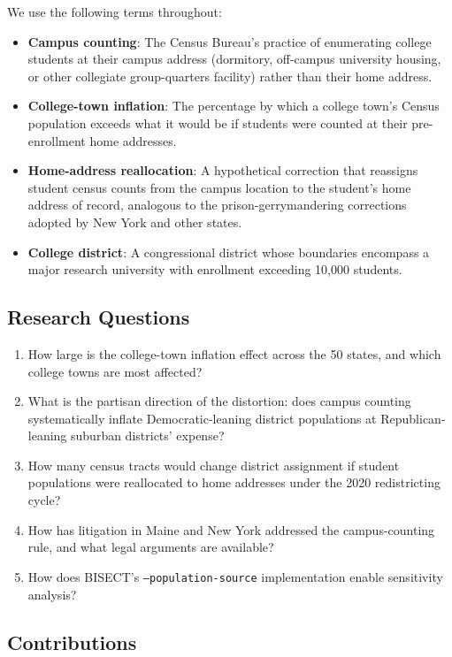 We use the following terms throughout:
\begin{itemize}
    \item \textbf{Campus counting}: The Census Bureau's practice of enumerating college students at their campus address (dormitory, off-campus university housing, or other collegiate group-quarters facility) rather than their home address.
    \item \textbf{College-town inflation}: The percentage by which a college town's Census population exceeds what it would be if students were counted at their pre-enrollment home addresses.
    \item \textbf{Home-address reallocation}: A hypothetical correction that reassigns student census counts from the campus location to the student's home address of record, analogous to the prison-gerrymandering corrections adopted by New York and other states.
    \item \textbf{College district}: A congressional district whose boundaries encompass a major research university with enrollment exceeding 10,000 students.
\end{itemize}

\subsection{Research Questions}

\begin{enumerate}
    \item How large is the college-town inflation effect across the 50 states, and which college towns are most affected?
    \item What is the partisan direction of the distortion: does campus counting systematically inflate Democratic-leaning district populations at Republican-leaning suburban districts' expense?
    \item How many census tracts would change district assignment if student populations were reallocated to home addresses under the 2020 redistricting cycle?
    \item How has litigation in Maine and New York addressed the campus-counting rule, and what legal arguments are available?
    \item How does BISECT's \texttt{--population-source} implementation enable sensitivity analysis?
\end{enumerate}

\subsection{Contributions}

